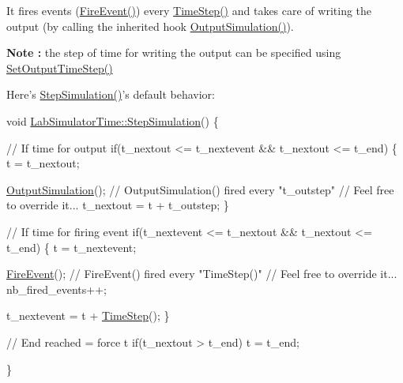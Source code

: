 It fires events (\hyperlink{classelps_1_1_lab_simulator_time_a6ed55e9c17248459dfa5c6ab9caee7f5}{Fire\+Event()}) every \hyperlink{classelps_1_1_lab_simulator_time_a5f3478468090fe5d741759a8806a6abf}{Time\+Step()} and takes care of writing the output (by calling the inherited hook \hyperlink{classelps_1_1_lab_simulator_base_ac0c49279bf16f19b4f8fbd856e3fc6d6}{Output\+Simulation()}).~\newline


{\bfseries Note \+:} the step of time for writing the output can be specified using \hyperlink{classelps_1_1_lab_simulator_time_add746d0dc50b20d56268d1dd5bba55b1}{Set\+Output\+Time\+Step()}

Here's \hyperlink{classelps_1_1_lab_simulator_time_ad8845591018d7d9bdf38932faa2a04dd}{Step\+Simulation()}'s default behavior\+:


\begin{DoxyCode}
\textcolor{keywordtype}{void} \hyperlink{classelps_1_1_lab_simulator_time_ad8845591018d7d9bdf38932faa2a04dd}{LabSimulatorTime::StepSimulation}()
\{

        \textcolor{comment}{// If time for output}
        \textcolor{keywordflow}{if}(t\_nextout <= t\_nextevent && t\_nextout <= t\_end)
        \{
                t = t\_nextout;

                \hyperlink{classelps_1_1_lab_simulator_base_ac0c49279bf16f19b4f8fbd856e3fc6d6}{OutputSimulation}();                     \textcolor{comment}{// OutputSimulation() fired every
       "t\_outstep"}
                                                        \textcolor{comment}{// Feel free to override it...}
                t\_nextout = t + t\_outstep;
        \}

        \textcolor{comment}{// If time for firing event}
        \textcolor{keywordflow}{if}(t\_nextevent <= t\_nextout && t\_nextout <= t\_end)
        \{
                t = t\_nextevent;

                \hyperlink{classelps_1_1_lab_simulator_time_a6ed55e9c17248459dfa5c6ab9caee7f5}{FireEvent}();                            \textcolor{comment}{// FireEvent() fired every "TimeStep()"}
                                                        \textcolor{comment}{// Feel free to override it...}
                nb\_fired\_events++;

                t\_nextevent = t + \hyperlink{classelps_1_1_lab_simulator_time_a5f3478468090fe5d741759a8806a6abf}{TimeStep}();
        \}

        \textcolor{comment}{// End reached = force t}
        \textcolor{keywordflow}{if}(t\_nextout > t\_end) t = t\_end;

\}
\end{DoxyCode}
 

